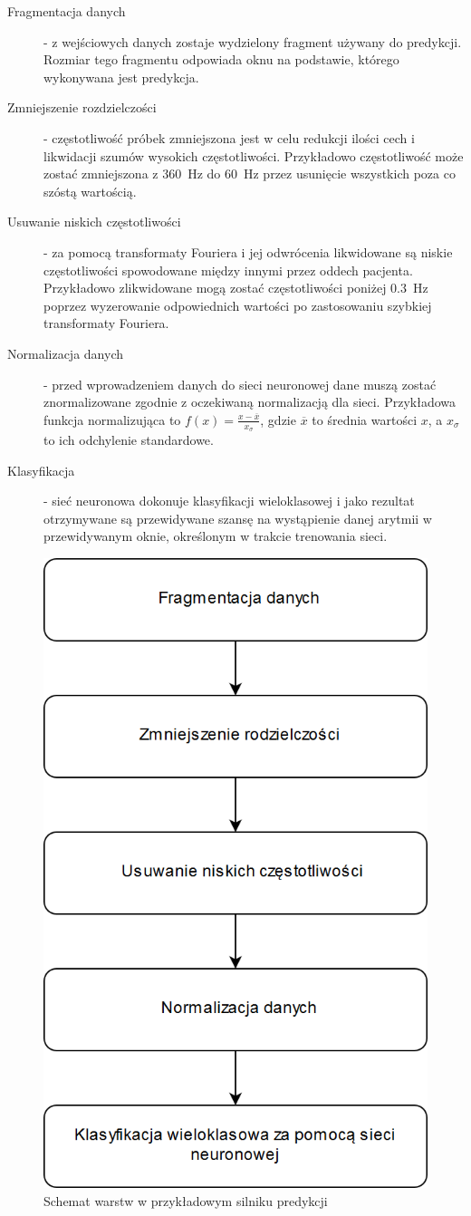 \documentclass[polish,12pt]{aghthesis}
\begin{document}
\begin{description}
	\item[Fragmentacja danych] - z wejściowych danych zostaje wydzielony fragment używany do predykcji. Rozmiar tego fragmentu odpowiada oknu na podstawie, którego wykonywana jest predykcja.
	\item[Zmniejszenie rozdzielczości] - częstotliwość próbek zmniejszona jest w celu redukcji ilości cech i likwidacji szumów wysokich częstotliwości. Przykładowo częstotliwość może zostać zmniejszona z \SI{360}{\hertz} do \SI{60}{\hertz} przez usunięcie wszystkich poza  co szóstą wartością.
	\item[Usuwanie niskich częstotliwości] - za pomocą transformaty Fouriera i jej odwrócenia likwidowane są niskie częstotliwości spowodowane między innymi przez oddech pacjenta. Przykładowo zlikwidowane mogą zostać częstotliwości poniżej \SI{0.3}{\hertz} poprzez wyzerowanie odpowiednich wartości po zastosowaniu szybkiej transformaty Fouriera.
	\item [Normalizacja danych] - przed wprowadzeniem danych do sieci neuronowej dane muszą zostać znormalizowane zgodnie z oczekiwaną normalizacją dla sieci. Przykładowa funkcja normalizująca to $f(x) = \frac{x - \overline{x}}{x_{\sigma}}$, gdzie $\overline{x}$ to średnia wartości $x$, a $x_{\sigma}$ to ich odchylenie standardowe.
	\item [Klasyfikacja] - sieć neuronowa dokonuje klasyfikacji wieloklasowej i jako rezultat otrzymywane są przewidywane szansę na wystąpienie danej arytmii w przewidywanym oknie, określonym w trakcie trenowania sieci.
\end{description}

\begin{figure}[h!]
	\centering
	\includegraphics[width=0.4\linewidth]{model_example_flow.png}
	\caption{Schemat warstw w przykładowym silniku predykcji}
	\label{fig:model_example_flow}
\end{figure}
\end{document}
